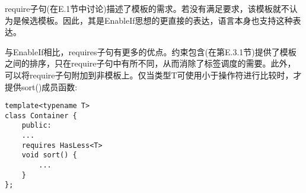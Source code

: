 require子句(在E.1节中讨论)描述了模板的需求。若没有满足要求，该模板就不认为是候选模板。因此，其是EnableIf思想的更直接的表达，语言本身也支持这种表达。

与EnableIf相比，requires子句有更多的优点。约束包含(在第E.3.1节)提供了模板之间的排序，只在require子句中有所不同，从而消除了标签调度的需要。此外，可以将require子句附加到非模板上。仅当类型T可使用小于操作符进行比较时，才提供sort()成员函数:

\begin{lstlisting}[style=styleCXX]
template<typename T>
class Container {
	public:
	...
	requires HasLess<T>
	void sort() {
		...
	}
};
\end{lstlisting}





